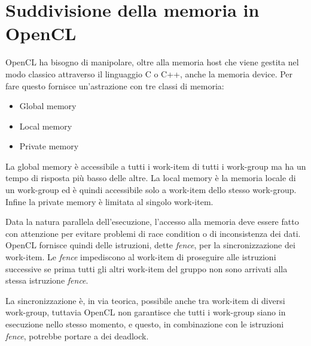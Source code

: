 \section{Suddivisione della memoria in OpenCL}

OpenCL ha bisogno di manipolare, oltre alla memoria host che viene gestita nel modo classico attraverso il linguaggio C o C++, anche la memoria device. 
Per fare questo fornisce un'astrazione con tre classi di memoria:

\begin{itemize}
	\item Global memory
	\item Local memory
	\item Private memory
\end{itemize}

La global memory è accessibile a tutti i work-item di tutti i work-group ma ha un tempo di risposta più basso delle altre.
La local memory è la memoria locale di un work-group ed è quindi accessibile solo a work-item dello stesso work-group.
Infine la private memory è limitata al singolo work-item.

Data la natura parallela dell'esecuzione, l'accesso alla memoria deve essere fatto con attenzione per evitare problemi di race condition o di inconsistenza dei dati.
OpenCL fornisce quindi delle istruzioni, dette \textit{fence}, per la sincronizzazione dei work-item. Le \textit{fence} impediscono al work-item di proseguire alle istruzioni successive se prima tutti gli altri work-item del gruppo non sono arrivati alla stessa istruzione \textit{fence}.

La sincronizzazione è, in via teorica, possibile anche tra work-item di diversi work-group, tuttavia OpenCL non garantisce che tutti i work-group siano in esecuzione nello stesso momento, e questo, in combinazione con le istruzioni \textit{fence}, potrebbe portare a dei deadlock.